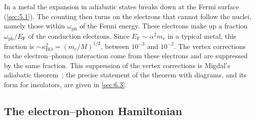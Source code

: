 In a metal the expansion in adiabatic states breaks down at the Fermi surface (\cref{sec:5.1}). The counting then turns on the electrons that cannot follow the nuclei, namely those within $\omega_{\mathrm{ph}}$ of the Fermi energy. These electrons make up a fraction $\omega_{\mathrm{ph}}/E_{\mathrm{F}}$ of the conduction electrons. Since $E_{\mathrm{F}} \sim \alpha^2m_e$ in a typical metal, this fraction is $\sim\kappa_{\mathrm{BO}}^2 = (m_e/M)^{1/2}$, between $10^{-3}$ and $10^{-2}$. The vertex corrections to the electron--phonon interaction come from these electrons and are suppressed by the same fraction. This suppression of the vertex corrections is Migdal's adiabatic theorem~\cite{migdal1958interaction}; the precise statement of the theorem with diagrams, and its form for insulators, are given in \cref{sec:6.3}.

\subsection{The electron--phonon Hamiltonian}

